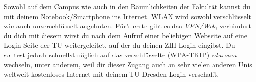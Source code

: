 Sowohl auf dem Campus wie auch in den Räumlichkeiten der Fakultät kannst du mit deinem Notebook/Smartphone ins Internet.
WLAN wird sowohl verschlüsselt wie auch unverschlüsselt angeboten.
Für's erste gibt es das \textit{VPN/Web}, verbindest du dich mit diesem wirst du nach dem Aufruf einer beliebigen Webseite auf eine Login-Seite der TU weitergeleitet, auf der du deinen ZIH-Login eingibst.
Du solltest jedoch schnellstmöglich auf das verschlüsselte (WPA-TKIP) \textit{eduroam} wechseln, unter anderem, weil dir dieser Zugang auch an sehr vielen anderen Unis weltweit kostenloses Internet mit deinem TU Dresden Login verschafft.

